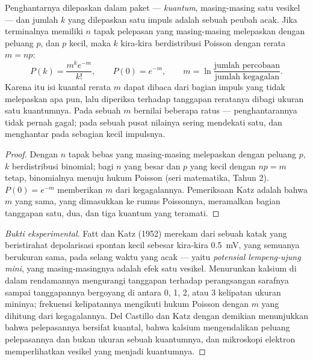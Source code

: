 \begin{theorem}\label{thm:b2:neurons-synapses:quantal}
Penghantarnya dilepaskan dalam paket --- \emph{kuantum}, masing-masing
satu vesikel --- dan jumlah $k$ yang dilepaskan satu impuls adalah
sebuah peubah acak. Jika terminalnya memiliki $n$ tapak pelepasan yang
masing-masing melepaskan dengan peluang $p$, dan $p$ kecil, maka $k$
kira-kira berdistribusi Poisson dengan rerata $m = np$:
\[
P(k) = \frac{m^{k}e^{-m}}{k!}, \qquad P(0) = e^{-m}, \qquad
m = \ln\frac{\text{jumlah percobaan}}{\text{jumlah kegagalan}}.
\]
Karena itu isi kuantal rerata $m$ dapat dibaca dari bagian impuls yang
tidak melepaskan apa pun, lalu diperiksa terhadap tanggapan reratanya
dibagi ukuran satu kuantumnya. Pada sebuah  $m$
bernilai beberapa ratus --- penghantarannya tidak pernah gagal; pada
sebuah  pusat nilainya sering mendekati satu, dan 
menghantar pada sebagian kecil impulsnya.
\end{theorem}
\begin{proof}
Dengan $n$ tapak bebas yang masing-masing melepaskan dengan peluang
$p$, $k$ berdistribusi binomial; bagi $n$ yang besar dan $p$ yang kecil
dengan $np = m$ tetap, binomialnya menuju hukum Poisson (seri
matematika, Tahun 2). $P(0) = e^{-m}$ memberikan $m$ dari
kegagalannya. Pemeriksaan Katz adalah bahwa $m$ yang sama, yang
dimasukkan ke rumus Poissonnya, meramalkan bagian tanggapan satu, dua,
dan tiga kuantum yang teramati.
\end{proof}
\begin{proof}[Bukti eksperimental]
Fatt dan Katz (1952) merekam dari sebuah  katak yang
beristirahat depolarisasi spontan kecil sebesar kira-kira
\qty{0.5}{mV}, yang semuanya berukuran sama, pada selang waktu yang
acak --- yaitu \emph{potensial lempeng-ujung mini}, yang
masing-masingnya adalah efek satu vesikel. Menurunkan kalsium di dalam
rendamannya mengurangi tanggapan terhadap perangsangan sarafnya sampai
tanggapannya bergoyang di antara 0, 1, 2, atau 3 kelipatan ukuran
mininya; frekuensi kelipatannya mengikuti hukum Poisson dengan $m$ yang
dihitung dari kegagalannya. Del Castillo dan Katz dengan demikian
menunjukkan bahwa pelepasannya bersifat kuantal, bahwa kalsium
mengendalikan peluang pelepasannya dan bukan ukuran sebuah kuantumnya,
dan mikroskopi elektron memperlihatkan vesikel yang menjadi kuantumnya.
\end{proof}

